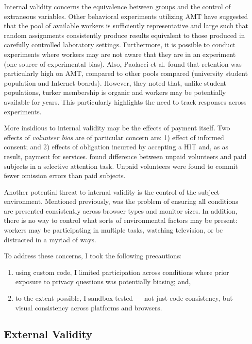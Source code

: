 Internal validity concerns the equivalence between groups and the control of extraneous variables. Other behavioral experiments utilizing AMT  \citep{Crump:2013fn}  have suggested that the pool of available workers is sufficiently representative and large such that random assignments consistently produce results equivalent to those produced in carefully controlled laboratory settings. Furthermore, it is possible to conduct experiments where workers may are not aware that they are in an experiment (one source of experimental bias). Also, Paolacci et al.  \citep{Paolacci:2010ws}  found that retention was particularly high on AMT, compared to other pools compared (university student population and Internet boards). However, they noted that, unlike student populations, turker membership is organic and workers may be potentially available for years. This particularly highlights the need to track responses across experiments.

More insidious to internal validity may be the effects of payment itself. Two effects of \emph{volunteer bias} are of particular concern are: 1) effect of informed consent; and 2) effects of obligation incurred by accepting a HIT and, as as result, payment for services.  \cite{Rush:1978tw}  found difference between unpaid volunteers and paid subjects in a selective attention task. Unpaid volunteers were found to commit fewer omission errors than paid subjects.

Another potential threat to internal validity is the control of the subject environment. Mentioned previously, was the problem of ensuring all conditions are presented consistently across browser types and monitor sizes. In addition, there is no way to control what sorts of environmental factors may be present: workers may be participating in multiple tasks, watching television, or be distracted in a myriad of ways.

To address these concerns, I took the following precautions:

\begin{enumerate}
\item using custom code, I limited participation across conditions where prior exposure to privacy questions was potentially biasing; and,
\item to the extent possible, I sandbox tested --- not just code consistency, but visual consistency across platforms and browsers.
\end{enumerate}


\subsection{External Validity}
\label{externalvalidity}

